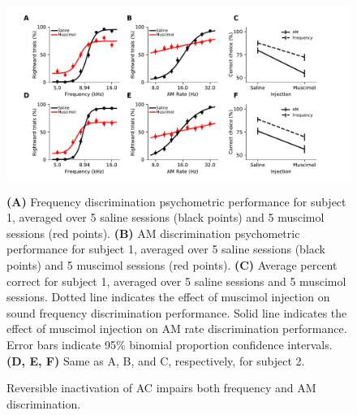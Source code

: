 \begin{figure}[hp] \begin{center}
    \includegraphics[width=6in]{figures/chapter4/figure_main_amod_effect}%
\end{center} \caption{Reversible inactivation of AC impairs both frequency and
AM discrimination.}{ \textbf{(A)} Frequency discrimination psychometric
performance for subject 1, averaged over 5 saline sessions (black points) and 5
muscimol sessions (red points).
%
\textbf{(B)} AM discrimination psychometric performance for subject 1, averaged
over 5 saline sessions (black points) and 5 muscimol sessions (red points). 
%
\textbf{(C)} Average percent correct for subject 1, averaged over 5 saline
sessions and 5 muscimol sessions.
%
Dotted line indicates the effect of muscimol injection on sound frequency
discrimination performance. 
%
Solid line indicates the effect of muscimol injection on AM rate discrimination
performance.
%
Error bars indicate 95\% binomial proportion confidence intervals.
%
\textbf{(D, E, F)} Same as A, B, and C, respectively, for subject 2.  }
\end{figure}
% 
% 
